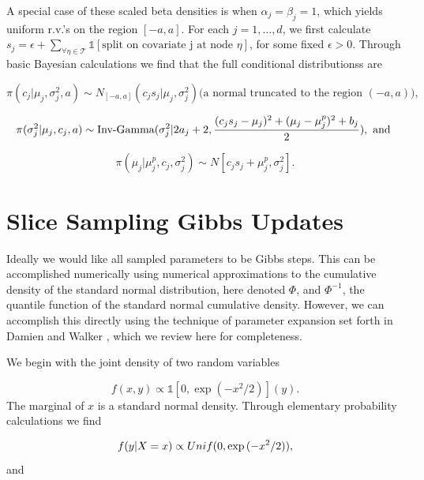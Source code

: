 A special case of these scaled beta densities is when $\alpha_j=\beta_j=1$, which yields uniform r.v.'s on the region  $[-a,a]$. 
For each $j=1, \dots, d$, we first calculate $s_j = \epsilon+\sum_{\forall \eta \in \mathcal{T}}\mathds{1}[\text{split on covariate j at node $\eta$}]$, for some fixed $\epsilon>0$.
Through basic Bayesian calculations we find that the full conditional distributionss are 

\begin{equation}
\pi(c_j\vert \mu_j, \sigma_j^2, a) \sim N_{[-a,a]}(c_js_j\vert \mu_j, \sigma^2_j) \text{(a normal truncated to the region $(-a,a)$),}
\end{equation}

\begin{equation}
\pi(\sigma^2_j \vert \mu_j, c_j, a) \sim \text{Inv-Gamma}({\sigma_j^2}\vert{2a_j+2},{\frac{(c_js_j-\mu_j)^2+ (\mu_j-\mu_j^p)^2+b_j}{2}}), \text{ and } 
\end{equation}

\begin{equation}
\pi(\mu_j\vert \mu_j^p, c_j, \sigma^2_j)\sim N[c_js_j+\mu_j^p, \sigma_j^2].
\end{equation}

\section{Slice Sampling Gibbs Updates}

Ideally we would like all sampled parameters to be Gibbs steps. This can be accomplished numerically using numerical approximations to the cumulative density of the standard normal distribution, here denoted $\Phi$, and $\Phi^{-1}$, the quantile function of the standard normal cumulative density.  However, we can accomplish this directly using the technique of parameter expansion set forth in Damien and Walker \cite{damien2001sampling}, which we review here for completeness. 
 
We begin with the joint density of two random variables 

\begin{equation}
f(x,y) \propto \mathds{1}[0, \exp{(-x^2/2)}](y).
\end{equation}
The marginal of $x$ is a standard normal density. Through elementary probability calculations we find 

\begin{equation}\newnot{symbol:unif}
f(y\vert X=x) \propto Unif(0, \exp{(-x^2/2)}),
\end{equation}
 and 
 
